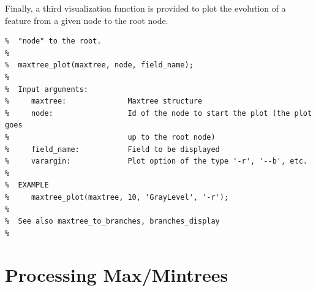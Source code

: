 \documentclass[DIV=calc, paper=a4, fontsize=11pt]{scrartcl}	 %
\begin{document}
Finally, a third visualization function is provided to plot the evolution of a feature from a given node to the root node. 
\begin{lstlisting}[aboveskip=0.5 \baselineskip]
%  maxtree_plot plots the field_name values of a Maxtree from the node
%  "node" to the root.
%
%  maxtree_plot(maxtree, node, field_name);
%
%  Input arguments:
%     maxtree:              Maxtree structure
%     node:                 Id of the node to start the plot (the plot goes
%                           up to the root node)
%     field_name:           Field to be displayed
%     varargin:             Plot option of the type '-r', '--b', etc. 
%
%  EXAMPLE
%     maxtree_plot(maxtree, 10, 'GrayLevel', '-r');
%
%  See also maxtree_to_branches, branches_display
%
\end{lstlisting}




\section{Processing Max/Mintrees}
\end{document}
